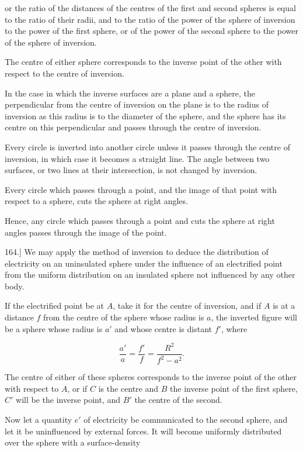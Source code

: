 \documentclass[11pt,a4paper]{article}
\begin{document}
or the ratio of the distances of the centres of the first and second spheres is equal to the ratio of their radii, and to the ratio of the power of the sphere of inversion to the power of the first sphere, or of the power of the second sphere to the power of the sphere of inversion.

The centre of either sphere corresponds to the inverse point of the
other with respect to the centre of inversion.

In the case in which the inverse surfaces are a plane and a sphere,
the perpendicular from the centre of inversion on the plane is to the
radius of inversion as this radius is to the diameter of the sphere,
and the sphere has its centre on this perpendicular and passes through
the centre of inversion.

Every circle is inverted into another circle unless it passes through
the centre of inversion, in which case it becomes a straight line. The
angle between two surfaces, or two lines at their intersection, is not
changed by inversion.

Every circle which passes through a point, and the image of that point
with respect to a sphere, cuts the sphere at right angles.

Hence, any circle which passes through a point and cuts the sphere at
right angles passes through the image of the point.

164.] We may apply the method of inversion to deduce the distribution
of electricity on an uninsulated sphere under the influence of an
electrified point from the uniform distribution on an insulated sphere
not influenced by any other body.

If the electrified point be at $A$, take it for the centre of
inversion, and if $A$ is at a distance $f$ from the centre of the
sphere whose radius is $a$, the inverted figure will be a sphere whose
radius is $a'$ and whose centre is distant $f'$, where

\begin{equation}\tag{20}
\frac{a'}{a}=\frac{f'}{f}=\frac{R^2}{f^2-a^2}.
\end{equation}

The centre of either of these spheres corresponds to the inverse point
of the other with respect to $A$, or if $C$ is the centre and $B$ the
inverse point of the first sphere, $C'$ will be the inverse point, and
$B'$ the centre of the second.

Now let a quantity $e'$ of electricity be communicated to the second
sphere, and let it be uninfluenced by external forces. It will become
uniformly distributed over the sphere with a surface-density
\end{document}
